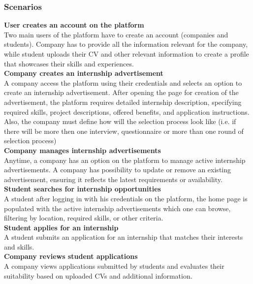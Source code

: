 \subsubsection{Scenarios}

\textbf{User creates an account on the platform}\\ 
Two main users of the platform have to create an account (companies and students). Company has to provide all the information relevant for the company, while student uploads their CV and other relevant information to create a profile that showcases their skills and experiences.\\

\textbf{Company creates an internship advertisement}\\
A company access the platform using their credentials and selects an option to create an internship advertisement. After opening the page for creation of the advertisement, the platform requires detailed internship description, specifying required skills, project descriptions, offered benefits, and application instructions. Also, the company must define how will the selection process look like (i.e. if there will be more then one interview, questionnaire or more than one round of selection process)  \\

\textbf{Company manages internship advertisements}\\
Anytime, a company has an option on the platform to manage active internship advertisements. A company has possibility to update or remove an existing advertisement, ensuring it reflects the latest requirements or availability.\\

\textbf{Student searches for internship opportunities}\\
A student after logging in with his credentials on the platform, the home page is populated with the active internship advertisements which one can browse, filtering by location, required skills, or other criteria.\\

\textbf{Student applies for an internship}\\
A student submits an application for an internship that matches their interests and skills.\\

\textbf{Company reviews student applications}\\
A company views applications submitted by students and evaluates their suitability based on uploaded CVs and additional information.\\

